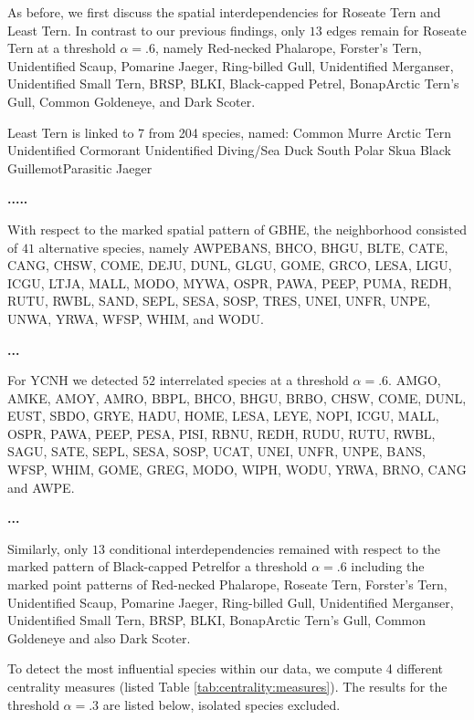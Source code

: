 \documentclass{statsoc}
\begin{document}
As before, we first discuss the spatial interdependencies for Roseate Tern and Least Tern. In contrast to our previous findings, only $13$ edges remain for Roseate Tern at a threshold $\alpha=.6$, namely Red-necked Phalarope, Forster's Tern, Unidentified Scaup, Pomarine Jaeger, Ring-billed Gull, Unidentified Merganser, Unidentified Small Tern, BRSP, BLKI, Black-capped Petrel,   BonapArctic Tern's Gull, Common Goldeneye, and Dark Scoter.

Least Tern is linked to 7 from 204 species, named:
   Common Murre Arctic Tern Unidentified Cormorant Unidentified Diving/Sea Duck South Polar Skua Black GuillemotParasitic Jaeger

\textbf{ .....}

With respect to the marked spatial pattern of GBHE, the neighborhood consisted of $41$ alternative species, namely AWPEBANS, BHCO, BHGU,  BLTE,  CATE, CANG, CHSW, COME, DEJU, DUNL, GLGU, GOME, GRCO, LESA, LIGU, ICGU, LTJA, MALL, MODO, MYWA, OSPR, PAWA, PEEP, PUMA, REDH, RUTU, RWBL, SAND, SEPL, SESA, SOSP, TRES, UNEI, UNFR, UNPE,  UNWA, YRWA, WFSP, WHIM, and WODU.
 
\textbf{...}

For YCNH we detected $52$ interrelated species at a threshold $\alpha=.6$. 
  AMGO, AMKE, AMOY, AMRO, BBPL, BHCO, BHGU, BRBO, CHSW, COME, DUNL, EUST, SBDO, GRYE, HADU, HOME, LESA, LEYE, NOPI, ICGU, MALL, OSPR, PAWA, PEEP, PESA, PISI, RBNU, REDH, RUDU, RUTU, RWBL, SAGU, SATE, SEPL, SESA, SOSP,
 UCAT, UNEI, UNFR, UNPE, BANS, WFSP, WHIM, GOME, GREG,
 MODO, WIPH, WODU, YRWA, BRNO, CANG and AWPE. 
 
\textbf{...}

Similarly, only $13$ conditional interdependencies remained with respect to the marked pattern of  Black-capped Petrelfor a threshold $\alpha=.6$ including the marked point patterns of Red-necked Phalarope, Roseate Tern, Forster's Tern, Unidentified Scaup, Pomarine Jaeger, Ring-billed Gull, Unidentified Merganser, Unidentified Small Tern, BRSP, BLKI,   BonapArctic Tern's Gull, Common Goldeneye and also Dark Scoter.


  





To detect the most influential species within our data, we compute 4 different centrality measures (listed Table \ref{tab:centrality:measures}). The results for the threshold $\alpha=.3$ are listed below, isolated species excluded.
\end{document}
